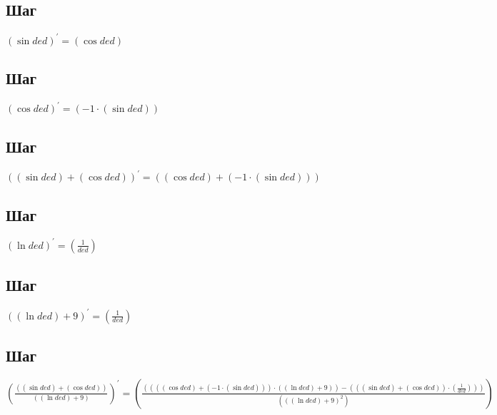 \documentclass[12pt, letterpaper]{report}
\begin{document}
\subsection{Шаг}
\begin{center} $(\sin{ded})^{\prime} = (\cos{ded})$ \end{center} 

\subsection{Шаг}
\begin{center} $(\cos{ded})^{\prime} = ({-1}\cdot{(\sin{ded})})$ \end{center} 

\subsection{Шаг}
\begin{center} $({(\sin{ded})}+{(\cos{ded})})^{\prime} = ({(\cos{ded})}+{({-1}\cdot{(\sin{ded})})})$ \end{center} 

\subsection{Шаг}
\begin{center} $(\ln{ded})^{\prime} = (\frac{1}{ded})$ \end{center} 

\subsection{Шаг}
\begin{center} $({(\ln{ded})}+{9})^{\prime} = (\frac{1}{ded})$ \end{center} 

\subsection{Шаг}
\begin{center} $(\frac{({(\sin{ded})}+{(\cos{ded})})}{({(\ln{ded})}+{9})})^{\prime} = (\frac{({({({(\cos{ded})}+{({-1}\cdot{(\sin{ded})})})}\cdot{({(\ln{ded})}+{9})})}-{({({(\sin{ded})}+{(\cos{ded})})}\cdot{(\frac{1}{ded})})})}{({({(\ln{ded})}+{9})}^{2})})$ \end{center} 

\end{document}
